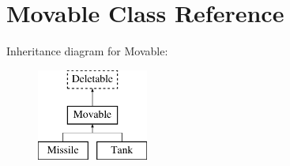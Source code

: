 \hypertarget{class_movable}{\section{Movable Class Reference}
\label{class_movable}
}
Inheritance diagram for Movable\+:\begin{figure}[H]
\begin{center}
\leavevmode
\includegraphics[height=3.000000cm]{class_movable}
\end{center}
\end{figure}

